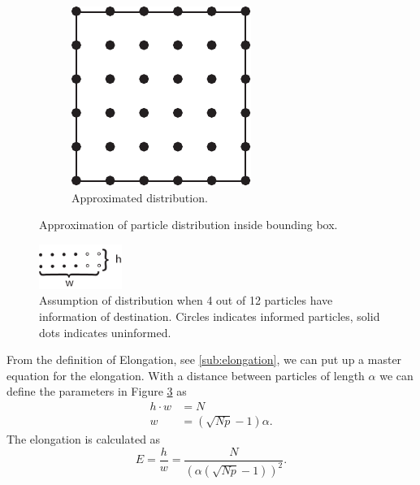 \begin{figure}[H]
\begin{subfigure}[b]{\figwidth}
		\includegraphics[width=\textwidth]{img/Square.pdf}
		\caption{Approximated distribution.}
		\label{fig:distr_approx}
	\end{subfigure}
	\caption{Approximation of particle distribution inside bounding box.}
	\label{fig:distr}
\end{figure}

\begin{figure}[H]
	\centering
	\includegraphics[width=0.24\textwidth]{img/heightwidth.pdf}
	\caption{Assumption of distribution when 4 out of 12 particles have information of destination. Circles indicates informed particles, solid dots indicates uninformed.}
	\label{fig:distr_direction}
\end{figure}
From the definition of Elongation, see \ref{sub:elongation}, we can put up a master equation for the elongation. 
With a distance between particles of length $\alpha$ we can define the parameters in Figure \ref{fig:distr_direction} as
\begin{align}
	h\cdot w &= N \\
	w &= (\sqrt{Np}-1)\alpha.
\end{align}
The elongation is calculated as 
\begin{equation}
	E = \frac{h}{w} = \frac{N}{(\alpha(\sqrt{Np}-1))^2}.
\end{equation}
